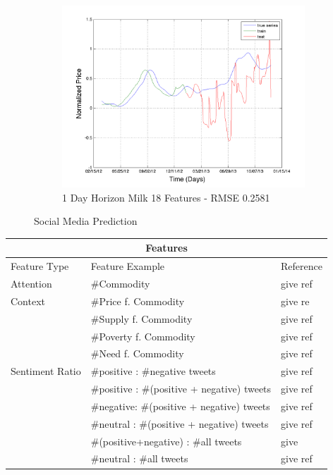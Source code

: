 \begin{figure}
       \hfill
       
        \begin{subfigure}[b]{0.5\textwidth}
                \includegraphics[width=\textwidth]{img/model/exp2/milk/pred_18}
                \caption{1 Day Horizon Milk 18 Features - RMSE 0.2581}
                \label{fig:mouse}
        \end{subfigure}%
    
        \caption{Social Media Prediction}\label{fig:animals}
\end{figure}





\begin{tabular}{ |p{3cm}|p{8cm}|p{3cm}|  }
 \hline
 \multicolumn{3}{|c|}{Features } \\
 \hline
 Feature Type & Feature Example & Reference   \\
\hline
Attention & \#Commodity  & give ref \\
\hline
Context & \#Price f. Commodity   & give re \\
		& \#Supply f. Commodity   & give ref \\
		& \#Poverty f. Commodity   & give ref \\
		& \#Need f. Commodity   & give ref \\



  \hline
   Sentiment Ratio & \#positive : \#negative tweets  & give ref\\
      			     & \#positive : \#(positive + negative) tweets   &  give ref\\
 			     & \#negative: \#(positive + negative) tweets &  give ref  \\
			     & \#neutral : \#(positive + negative) tweets & give ref  \\
			     & \#(positive+negative) : \#all tweets & give  \\			     
			     & \#neutral : \#all tweets & give ref\\
                          
   \hline
   


\end{tabular}




